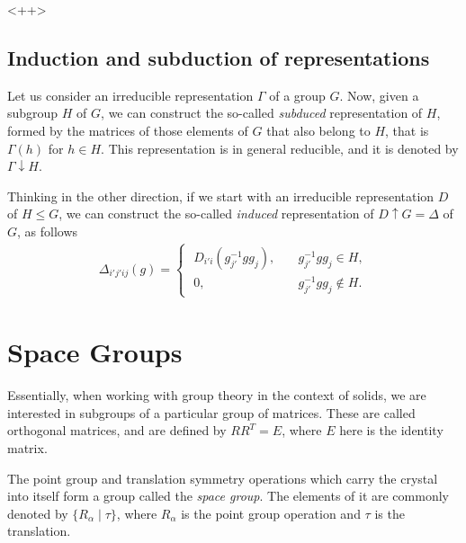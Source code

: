 <++>

\subsection{Induction and subduction of representations}

Let us consider an irreducible representation $\Gamma$ of a group $G$. Now, given a subgroup $H$ of $G$, we can construct the so-called \textit{subduced} representation of $H$, formed by the matrices of those elements of $G$ that also belong to $H$, that is $\Gamma(h)$ for $h \in H$. This representation is in general reducible, and it is denoted by $\Gamma \downarrow H$.

Thinking in the other direction, if we start with an irreducible representation $D$ of $H \leq G$, we can construct the so-called \textit{induced} representation of $D \uparrow G = \Delta$ of $G$, as follows
\begin{align*}
\Delta_{i'j'ij}(g) =
\begin{cases}
\; D_{i'i}(g_{j'}^{-1} g g_j), \quad & g_{j'}^{-1} g g_j \in H, \\
\; 0,  & g_{j'}^{-1} g g_j \notin H.
\end{cases}
\end{align*}


\section{Space Groups}


Essentially, when working with group theory in the context of solids, we are interested in subgroups of a particular group of matrices. These are called orthogonal matrices, and are defined by $R R^T = E$, where $E$ here is the identity matrix.

\n

The point group and translation symmetry operations which carry the crystal into itself form a group called the \textit{space group}. The elements of it are commonly denoted by  $\{ R_\alpha \mid \tau \} $, where $R_\alpha$ is the point group operation and $\tau$ is the translation.

